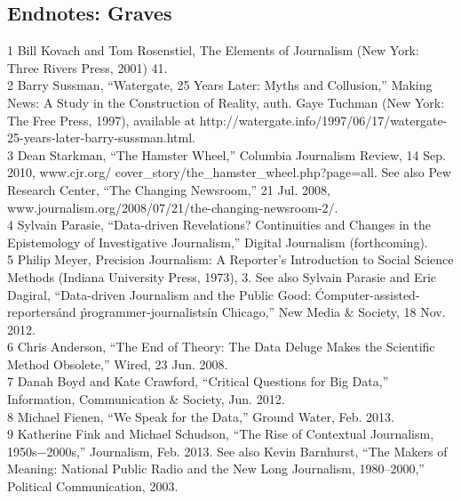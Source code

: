 \begin{itemize}
\section{Endnotes: Graves}
1 Bill Kovach and Tom Rosenstiel, The Elements of Journalism (New York: Three Rivers Press, 2001) 41.\\
2 Barry Sussman, ``Watergate, 25 Years Later: Myths and Collusion,'' Making News: A Study in the
Construction of Reality, auth. Gaye Tuchman (New York: The Free Press, 1997), available at
http://watergate.info/1997/06/17/watergate-25-years-later-barry-sussman.html.\\
3 Dean Starkman, ``The Hamster Wheel,'' Columbia Journalism Review, 14 Sep. 2010, www.cjr.org/
cover_story/the_hamster_wheel.php?page=all. See also Pew Research Center, ``The Changing
Newsroom,'' 21 Jul. 2008, www.journalism.org/2008/07/21/the-changing-newsroom-2/.\\
4 Sylvain Parasie, ``Data-driven Revelations? Continuities and Changes in the Epistemology of
Investigative Journalism,'' Digital Journalism (forthcoming).\\
5 Philip Meyer, Precision Journalism: A Reporter's Introduction to Social Science Methods
(Indiana University Press, 1973), 3. See also Sylvain Parasie and Eric Dagiral, ``Data-driven Journalism and the Public Good: \'Computer-assisted-reporters\' and \'programmer-journalists\'in Chicago,'' New Media & Society, 18 Nov. 2012.\\
6 Chris Anderson, ``The End of Theory: The Data Deluge Makes the Scientific Method Obsolete,''
Wired, 23 Jun. 2008.\\
7 Danah Boyd and Kate Crawford, ``Critical Questions for Big Data,'' Information, Communication &
Society, Jun. 2012.\\
8 Michael Fienen, ``We Speak for the Data,'' Ground Water, Feb. 2013.\\
9 Katherine Fink and Michael Schudson, ``The Rise of Contextual Journalism, 1950s−2000s,''
Journalism, Feb. 2013. See also Kevin Barnhurst, ``The Makers of Meaning: National Public Radio
and the New Long Journalism, 1980–2000,'' Political Communication, 2003.\\


\end{itemize}

